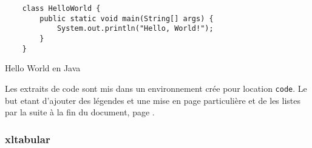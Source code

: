 \begin{code}
    \begin{verbatim}
    class HelloWorld {
        public static void main(String[] args) {
            System.out.println("Hello, World!");
        }
    }
\end{verbatim}
    \caption{Hello World en Java}
\end{code}

Les extraits de code sont mis dans un environnement crée pour location \verb=code=.
Le but etant d'ajouter des légendes et une mise en page particulière et de les listes par la suite à la fin du document,
page \pageref{TableOfCode}.

\subsubsection{xltabular}